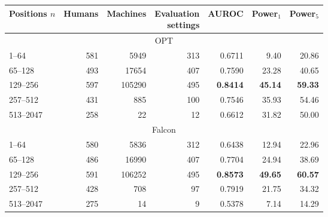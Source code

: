 \begin{tabular}{@{}lrrrrrr@{}}
\toprule
Positions $n$ & Humans & Machines & \shortstack{Evaluation\\settings} & AUROC & Power$_1$ & Power$_5$ \\
\midrule
\multicolumn{7}{c}{OPT} \\
1--64 & 581 & 5949 & 313 & 0.6711 & 9.40 & 20.86 \\
65--128 & 493 & 17654 & 407 & 0.7590 & 23.28 & 40.65 \\
129--256 & 597 & 105290 & 495 & \textbf{0.8414} & \textbf{45.14} & \textbf{59.33} \\
257--512 & 431 & 885 & 100 & 0.7546 & 35.93 & 54.46 \\
513--2047 & 258 & 22 & 12 & 0.6612 & 31.82 & 50.00 \\
\midrule
\multicolumn{7}{c}{Falcon} \\
1--64 & 580 & 5836 & 312 & 0.6438 & 12.94 & 22.96 \\
65--128 & 486 & 16990 & 407 & 0.7704 & 24.94 & 38.69 \\
129--256 & 591 & 106252 & 495 & \textbf{0.8573} & \textbf{49.65} & \textbf{60.57} \\
257--512 & 428 & 708 & 97 & 0.7919 & 21.75 & 34.32 \\
513--2047 & 275 & 14 & 9 & 0.5378 & 7.14 & 14.29 \\
\bottomrule
\end{tabular}

